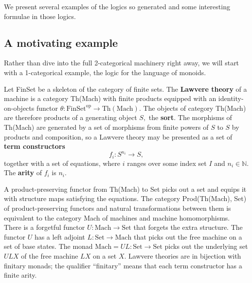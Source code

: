 \documentclass{article}
\newcommand{\maps}{\colon}
\newcommand{\FinSet}{\mathrm{FinSet}}
\newcommand{\Set}{\mathrm{Set}}
\newcommand{\Mach}{\mathrm{Mach}}
\newcommand{\op}{\mathrm{op}}
\newcommand{\NN}{\mathbb{N}}
\begin{document}
  We present several examples of the logics so generated and some interesting formulae in those logics.

\subsection{A motivating example}

Rather than dive into the full 2-categorical machinery right away, we will start with a 1-categorical example, the logic for the language of monoids.

Let FinSet be a skeleton of the category of finite sets.  The {\bf Lawvere theory} of a machine is a category Th(Mach) with finite products equipped with an identity-on-objects functor $\theta\maps \FinSet^\op \to \mathrm{Th(Mach)}.$  The objects of category Th(Mach) are therefore products of a generating object $S,$ the {\bf sort}.  The morphisms of Th(Mach) are generated by a set of morphisms from finite powers of $S$ to $S$ by products and composition, so a Lawvere theory may be presented as a set of {\bf term constructors}
\[ f_i\maps S^{n_i} \to S, \]
together with a set of equations, where $i$ ranges over some index set $I$ and $n_i \in \NN$.  The {\bf arity} of $f_i$ is $n_i.$

A product-preserving functor from Th(Mach) to Set picks out a set and equips it with structure maps satisfying the equations.  The category Prod(Th(Mach), Set) of product-preserving functors and natural transformations between them is equivalent to the category Mach of machines and machine homomorphisms.  There is a forgetful functor ${U\maps \Mach \to \Set}$ that forgets the extra structure.  The functor $U$ has a left adjoint ${L\maps \Set \to \Mach}$ that picks out the free machine on a set of base states.  The monad $\Mach = UL\maps \Set \to \Set$ picks out the underlying set $ULX$ of the free machine $LX$ on a set $X$.  Lawvere theories are in bijection with finitary monads; the qualifier ``finitary'' means that each term constructor has a finite arity.
\end{document}
